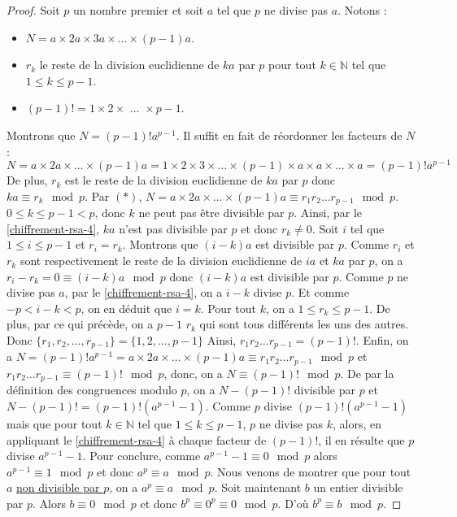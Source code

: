   \begin{proof}
    Soit $p$ un nombre premier et soit $a$ tel que $p$ ne divise pas $a$. Notons :
    \begin{itemize}
      \item $N = a \times 2a \times 3a \times \dots \times (p-1)a$.
      \item $r_k$ le reste de la division euclidienne de $ka$ par $p$ pour tout $k \in \mathbb{N}$ tel que $1 \leq k \leq p-1$.
      \item $(p-1)! = 1 \times 2 \times \text { ... } \times p-1$.
    \end{itemize}
    Montrons que $N = (p-1)! a^{p-1}$. Il suffit en fait de réordonner les facteurs de $N$ :
    \[ N = a \times 2a \times \dots \times (p-1)a = 1 \times 2 \times 3 \times \dots \times (p-1) \times a \times a \times \dots \times a = (p-1)!a^{p-1} \tag{$*$} \]
    De plus, $r_k$ est le reste de la division euclidienne de $ka$ par $p$ donc $ka \equiv r_k \mod p$. Par $(*)$, $N = a \times 2a \times \dots \times (p-1)a \equiv r_1 r_2 \dots r_{p-1} \mod p$. $0 \leq k \leq p-1 < p$, donc $k$ ne peut pas être divisible par $p$. Ainsi, par le \cref{chiffrement-rsa-4}, $ka$ n'est pas divisible par $p$ et donc $r_k \neq 0$.
    \newpar
    Soit $i$ tel que $1 \leq i \leq p-1$ et $r_i = r_k$. Montrons que $(i-k)a$ est divisible par $p$. Comme $r_i$ et $r_k$ sont respectivement le reste de la division euclidienne de $ia$ et $ka$ par $p$, on a $r_i - r_k = 0 \equiv (i-k)a \mod p$ donc $(i-k)a$ est divisible par $p$. Comme $p$ ne divise pas $a$, par le \cref{chiffrement-rsa-4}, on a $i-k$ divise $p$. Et comme $-p < i-k < p$, on en déduit que $i=k$.
    \newpar
    Pour tout $k$, on a $1 \leq r_k \leq p-1$. De plus, par ce qui précède, on a $p-1$ $r_k$ qui sont tous différents les uns des autres. Donc $\{r_1, r_2, \dots, r_{p-1} \} = \{1, 2, \dots, p-1 \}$  Ainsi, $r_1 r_2 \dots r_{p-1} = (p-1)!$.
    \newpar
    Enfin, on a $N = (p-1)!a^{p-1} = a \times 2a \times \dots \times (p-1)a \equiv r_1 r_2 \dots r_{p-1} \mod p$ et $r_1 r_2 \dots r_{p-1} \equiv (p-1)! \mod p$, donc, on a $N \equiv (p-1)! \mod p$. De par la définition des congruences modulo $p$, on a $N - (p-1)!$ divisible par $p$ et $N - (p-1)! = (p-1)!(a^{p-1} - 1)$. Comme $p$ divise $(p-1)!(a^{p-1} - 1)$ mais que pour tout $k \in \mathbb{N}$ tel que $1 \leq k \leq p-1$, $p$ ne divise pas $k$, alors, en appliquant le \cref{chiffrement-rsa-4} à chaque facteur de $(p-1)!$, il en résulte que $p$ divise $a^{p-1} - 1$.
    \newpar
    Pour conclure, comme $a^{p-1} - 1 \equiv 0 \mod p$ alors $a^{p-1} \equiv 1 \mod p$ et donc $a^p \equiv a \mod p$. Nous venons de montrer que pour tout $a$ \uline{non divisible par $p$}, on a $a^p \equiv a \mod p$. Soit maintenant $b$ un entier divisible par $p$. Alors $b \equiv 0 \mod p$ et donc $b^p \equiv 0^p \equiv 0 \mod p$. D'où $b^p \equiv b \mod p$.
  \end{proof}

